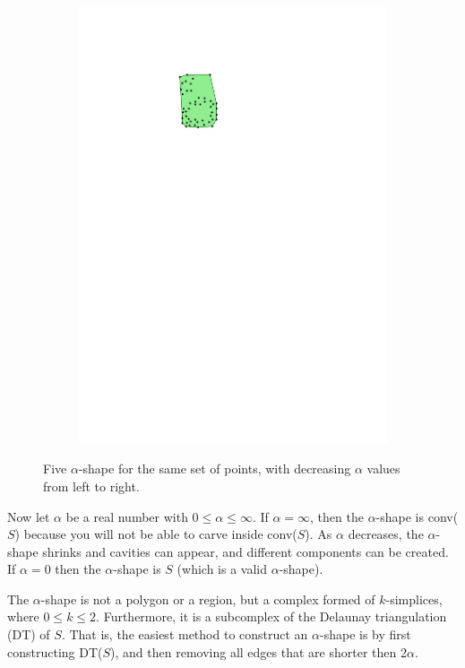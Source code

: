 \begin{figure}
\begin{subfigure}[b]{0.15\linewidth}
    \includegraphics[page=5,width=\textwidth]{figs/alphashape.pdf}
  \end{subfigure}
\caption{Five $\alpha$-shape for the same set of points, with decreasing $\alpha$ values from left to right.}%
\end{figure}


%

Now let $\alpha$ be a real number with $0 \leq \alpha \leq \infty$.
If $\alpha = \infty$, then the $\alpha$-shape is conv($S$) because you will not be able to carve inside conv($S$).
As $\alpha$ decreases, the $\alpha$-shape shrinks and cavities can appear, and different components can be created.
If $\alpha = 0$ then the $\alpha$-shape is $S$ (which is a valid $\alpha$-shape).

%

The $\alpha$-shape is not a polygon or a region, but a complex formed of $k$-simplices, where $0 \leq k \leq 2$.
Furthermore, it is a subcomplex of the Delaunay triangulation (DT) of $S$.
That is, the easiest method to construct an $\alpha$-shape is by first constructing DT($S$), and then removing all edges that are shorter then $2\alpha$.

